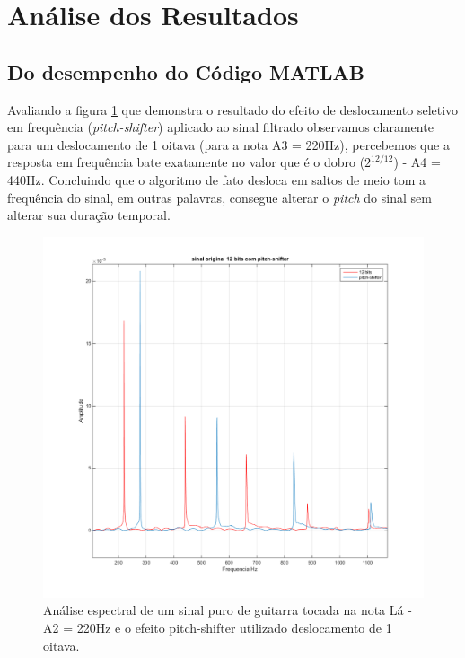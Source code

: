 		\section{Análise dos Resultados}
			
			\subsection{Do desempenho do Código MATLAB}
			
				Avaliando a figura \ref{fig-nota-la-01} que demonstra o resultado do efeito de deslocamento seletivo em frequência (\textit{pitch-shifter}) aplicado ao sinal filtrado observamos claramente para um deslocamento de 1 oitava (para a nota A3 = 220Hz), percebemos que a resposta em frequência bate exatamente no valor que é o dobro ($ 2^{12/12} $) - A4 = 440Hz. Concluindo que o algoritmo de fato desloca em saltos de meio tom a frequência do sinal, em outras palavras, consegue alterar o \textit{pitch} do sinal sem alterar sua duração temporal.
				
				\begin{figure}[!ht]
					\centering
					\includegraphics[scale=0.5]{./figuras/12bits-pitch-shifter.png}
					\caption{Análise espectral de um sinal puro de guitarra tocada na nota Lá - A2 = 220Hz e o efeito pitch-shifter utilizado deslocamento de 1 oitava.}
					\label{fig-nota-la-01}
				\end{figure}
				

